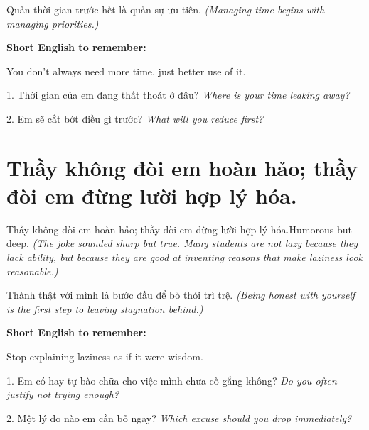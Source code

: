 \begin{baihoc}
Quản thời gian trước hết là quản sự ưu tiên.
\textit{(Managing time begins with managing priorities.)}
\end{baihoc}

\begin{ghinhoanh}
\textbf{Short English to remember:}

You don't always need more time, just better use of it.

\end{ghinhoanh}

\begin{tuhocnhanh}
1. Thời gian của em đang thất thoát ở đâu? \textit{Where is your time leaking away?}

2. Em sẽ cắt bớt điều gì trước? \textit{What will you reduce first?}
\end{tuhocnhanh}
\ngancach

\section{Thầy không đòi em hoàn hảo; thầy đòi em đừng lười hợp lý hóa.}
\begin{truyen}{Thầy không đòi em hoàn hảo; thầy đòi em đừng lười hợp lý hóa.}{Humorous but deep.}
\textit{(The joke sounded sharp but true. Many students are not lazy because they lack ability, but because they are good at inventing reasons that make laziness look reasonable.)}
\end{truyen}

\begin{baihoc}
Thành thật với mình là bước đầu để bỏ thói trì trệ.
\textit{(Being honest with yourself is the first step to leaving stagnation behind.)}
\end{baihoc}

\begin{ghinhoanh}
\textbf{Short English to remember:}

Stop explaining laziness as if it were wisdom.

\end{ghinhoanh}

\begin{tuhocnhanh}
1. Em có hay tự bào chữa cho việc mình chưa cố gắng không? \textit{Do you often justify not trying enough?}

2. Một lý do nào em cần bỏ ngay? \textit{Which excuse should you drop immediately?}
\end{tuhocnhanh}
\ngancach

